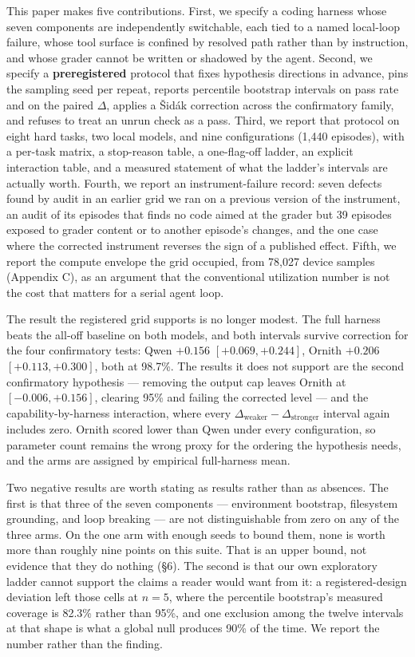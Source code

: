 \documentclass[
  10pt,
  a4paper,
]{article}
\newcounter{none} %
\begin{document}
This paper makes five contributions. First, we specify a coding harness
whose seven components are independently switchable, each tied to a
named local-loop failure, whose tool surface is confined by resolved
path rather than by instruction, and whose grader cannot be written or
shadowed by the agent. Second, we specify a \textbf{preregistered}
protocol that fixes hypothesis directions in advance, pins the sampling
seed per repeat, reports percentile bootstrap intervals on pass rate and
on the paired \(\Delta\), applies a Šidák correction across the
confirmatory family, and refuses to treat an unrun check as a pass.
Third, we report that protocol on eight hard tasks, two local models,
and nine configurations (1,440 episodes), with a per-task matrix, a
stop-reason table, a one-flag-off ladder, an explicit interaction table,
and a measured statement of what the ladder's intervals are actually
worth. Fourth, we report an instrument-failure record: seven defects
found by audit in an earlier grid we ran on a previous version of the
instrument, an audit of its episodes that finds no code aimed at the
grader but 39 episodes exposed to grader content or to another episode's
changes, and the one case where the corrected instrument reverses the
sign of a published effect. Fifth, we report the compute envelope the
grid occupied, from 78,027 device samples (Appendix C), as an argument
that the conventional utilization number is not the cost that matters
for a serial agent loop.

The result the registered grid supports is no longer modest. The full
harness beats the all-off baseline on both models, and both intervals
survive correction for the four confirmatory tests: Qwen \(+0.156\)
\([+0.069, +0.244]\), Ornith \(+0.206\) \([+0.113, +0.300]\), both at
98.7\%. The results it does not support are the second confirmatory
hypothesis --- removing the output cap leaves Ornith at
\([-0.006, +0.156]\), clearing 95\% and failing the corrected level ---
and the capability-by-harness interaction, where every
\(\Delta_{\text{weaker}}-\Delta_{\text{stronger}}\) interval again
includes zero. Ornith scored lower than Qwen under every configuration,
so parameter count remains the wrong proxy for the ordering the
hypothesis needs, and the arms are assigned by empirical full-harness
mean.

Two negative results are worth stating as results rather than as
absences. The first is that three of the seven components ---
environment bootstrap, filesystem grounding, and loop breaking --- are
not distinguishable from zero on any of the three arms. On the one arm
with enough seeds to bound them, none is worth more than roughly nine
points on this suite. That is an upper bound, not evidence that they do
nothing (§6). The second is that our own exploratory ladder cannot
support the claims a reader would want from it: a registered-design
deviation left those cells at \(n=5\), where the percentile bootstrap's
measured coverage is 82.3\% rather than 95\%, and one exclusion among
the twelve intervals at that shape is what a global null produces 90\%
of the time. We report the number rather than the finding.
\end{document}
